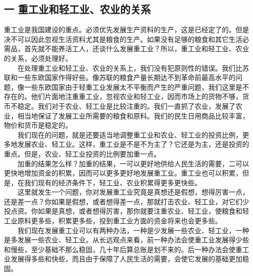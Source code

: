 \documentclass[cn,11pt,chinese]{elegantbook}
\def\myformat#1{\hfil\hfil #1}
\begin{document}
\subsection*{\myformat{一 重工业和轻工业、农业的关系}}
重工业是我国建设的重点。必须优先发展生产资料的生产，这是已经定了的。但是决不可以因此忽视生活资料尤其是粮食的生产。如果没有足够的粮食和其它生活必需品，首先就不能养活工人，还谈什么发展重工业？所以，重工业和轻工业、农业的关系，必须处理好。\\
　　在处理重工业和轻工业、农业的关系上，我们没有犯原则性的错误。我们比苏联和一些东欧国家作得好些。像苏联的粮食产量长期达不到革命前最高水平的问题，像一些东欧国家由于轻重工业发展太不平衡而产生的严重问题，我们这里是不存在的。他们片面地注重重工业，忽视农业和轻工业，因而市场上的货物不够，货币不稳定。我们对于农业、轻工业是比较注重的。我们一直抓了农业，发展了农业，相当地保证了发展工业所需要的粮食和原料。我们的民生日用商品比较丰富，物价和货币是稳定的。\\
　　我们现在的问题，就是还要适当地调整重工业和农业、轻工业的投资比例，更多地发展农业、轻工业。这样，重工业是不是不为主了？它还是为主，还是投资的重点。但是，农业、轻工业投资的比例要加重一点。\\
　　加重的结果怎么样？加重的结果，一可以更好地供给人民生活的需要，二可以更快地增加资金的积累，因而可以更多更好地发展重工业。重工业也可以积累，但是，在我们现有的经济条件下，轻工业、农业积累得更多更快些。\\
　　这里就发生一个问题，你对发展重工业究竟是真想还是假想，想得厉害一点，还是差一点？你如果是假想，或者想得差一点，那就打击农业、轻工业，对它们少投点资。你如果是真想，或者想得厉害，那你就要注重农业、轻工业，使粮食和轻工业原料更多些，积累更多些，投到重工业方面的资金将来也会更多些。\\
　　我们现在发展重工业可以有两种办法，一种是少发展一些农业、轻工业，一种是多发展一些农业、轻工业。从长远观点来看，前一种办法会使重工业发展得少些和慢些，至少基础不那么稳固，几十年后算总账是划不来的。后一种办法会使重工业发展得多些和快些，而且由于保障了人民生活的需要，会使它发展的基础更加稳固。\\
\end{document}
